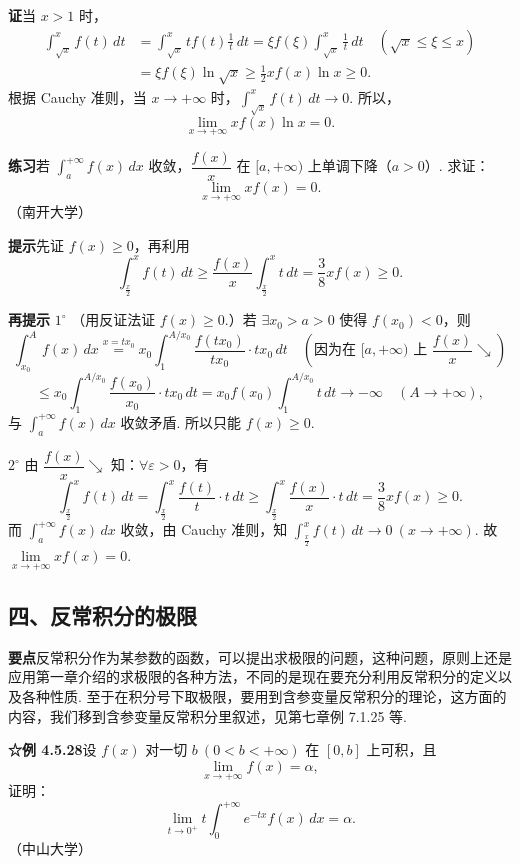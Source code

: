 \documentclass[UTF8,12pt,a4paper,fontset=fandol]{ctexart}
\begin{document}
\noindent\textbf{证}\quad 当 $x>1$ 时，
\[
\begin{aligned}
\int_{\sqrt x}^{x}f(t)\,dt
&=\int_{\sqrt x}^{x}tf(t)\frac1t\,dt
=\xi f(\xi)\int_{\sqrt x}^{x}\frac1t\,dt\quad(\sqrt x\le\xi\le x)\\
&=\xi f(\xi)\ln\sqrt x
\ge\frac12xf(x)\ln x\ge0.
\end{aligned}
\]
根据 Cauchy 准则，当 $x\to+\infty$ 时，$\displaystyle\int_{\sqrt x}^{x}f(t)\,dt\to0$. 所以，
\[
\lim_{x\to+\infty}xf(x)\ln x=0.
\]

\noindent\textbf{练习}\quad 若 $\displaystyle\int_a^{+\infty}f(x)\,dx$ 收敛，$\dfrac{f(x)}x$ 在 $[a,+\infty)$ 上单调下降（$a>0$）. 求证：
\[
\lim_{x\to+\infty}xf(x)=0.
\]
（南开大学）

\noindent\textbf{提示}\quad 先证 $f(x)\ge0$，再利用
\[
\int_{\frac x2}^{x}f(t)\,dt
\ge\frac{f(x)}x\int_{\frac x2}^{x}t\,dt
=\frac38xf(x)\ge0.
\]

\noindent\textbf{再提示}\quad
$1^\circ$ （用反证法证 $f(x)\ge0$.）若 $\exists x_0>a>0$ 使得 $f(x_0)<0$，则
\[
\int_{x_0}^A f(x)\,dx
\stackrel{x=tx_0}{=}x_0\int_1^{A/x_0}\frac{f(tx_0)}{tx_0}\cdot tx_0\,dt
\quad\left(\text{因为在 }[a,+\infty)\text{ 上 }\frac{f(x)}x\searrow\right)
\]
\[
\le x_0\int_1^{A/x_0}\frac{f(x_0)}{x_0}\cdot tx_0\,dt
=x_0f(x_0)\int_1^{A/x_0}t\,dt\to-\infty\quad(A\to+\infty),
\]
与 $\displaystyle\int_a^{+\infty}f(x)\,dx$ 收敛矛盾. 所以只能 $f(x)\ge0$.

$2^\circ$ 由 $\dfrac{f(x)}x\searrow$ 知：$\forall\varepsilon>0$，有
\[
\int_{\frac x2}^{x}f(t)\,dt
=\int_{\frac x2}^{x}\frac{f(t)}t\cdot t\,dt
\ge\int_{\frac x2}^{x}\frac{f(x)}x\cdot t\,dt
=\frac38xf(x)\ge0.
\]
而 $\displaystyle\int_a^{+\infty}f(x)\,dx$ 收敛，由 Cauchy 准则，知 $\displaystyle\int_{\frac x2}^{x}f(t)\,dt\to0\ (x\to+\infty)$. 故 $\lim\limits_{x\to+\infty}xf(x)=0$.

\subsection*{四、反常积分的极限}

\noindent\textbf{要点}\quad 反常积分作为某参数的函数，可以提出求极限的问题，这种问题，原则上还是应用第一章介绍的求极限的各种方法，不同的是现在要充分利用反常积分的定义以及各种性质. 至于在积分号下取极限，要用到含参变量反常积分的理论，这方面的内容，我们移到含参变量反常积分里叙述，见第七章例 7.1.25 等.

\noindent\textbf{☆例 4.5.28}\quad 设 $f(x)$ 对一切 $b\ (0<b<+\infty)$ 在 $[0,b]$ 上可积，且
\[
\lim_{x\to+\infty}f(x)=\alpha,
\]
证明：
\[
\lim_{t\to0^+}t\int_0^{+\infty}e^{-tx}f(x)\,dx=\alpha. \tag{1}
\]
（中山大学）
\end{document}
